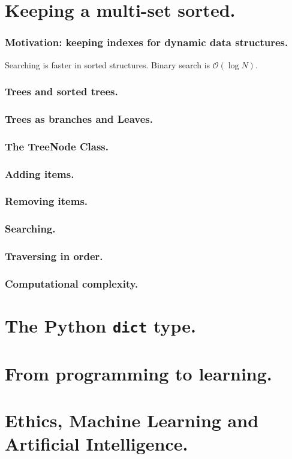 \documentclass{beamer} %
\begin{document}
\section{Keeping a multi-set sorted.}

\begin{frame}
\frametitle{Motivation: keeping indexes for dynamic data structures.}

\begin{iterate}
  \item Searching is faster in sorted structures. Binary search is $\mathcal{O}(\log N)$.
\end{iterate}

\end{frame}

\begin{frame}
\frametitle{Trees and sorted trees.}
\end{frame}

\begin{frame}
\frametitle{Trees as branches and Leaves.}
\end{frame}

\begin{frame}
\frametitle{The TreeNode Class.}
\end{frame}

\begin{frame}
\frametitle{Adding items.}
\end{frame}

\begin{frame}
\frametitle{Removing items.}
\end{frame}

\begin{frame}
\frametitle{Searching.}
\end{frame}

\begin{frame}
\frametitle{Traversing in order.}
\end{frame}

\begin{frame}
\frametitle{Computational complexity.}
\end{frame}

\section{The Python \texttt{dict} type.}

\section{From programming to learning.}

\section{Ethics, Machine Learning and Artificial Intelligence.}



\end{document}

